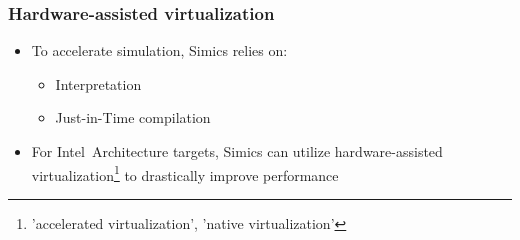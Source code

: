 \begin{frame}
\frametitle{Hardware-assisted virtualization}

\begin{itemize}
\item To accelerate simulation, Simics relies on:
  \begin{itemize}
  \item Interpretation
  \item Just-in-Time compilation
  \end{itemize}
\item For Intel\circledR\ Architecture targets, Simics can utilize hardware-assisted virtualization\footnote{'accelerated virtualization', 'native virtualization'} to drastically improve performance
\end{itemize}

\end{frame}
